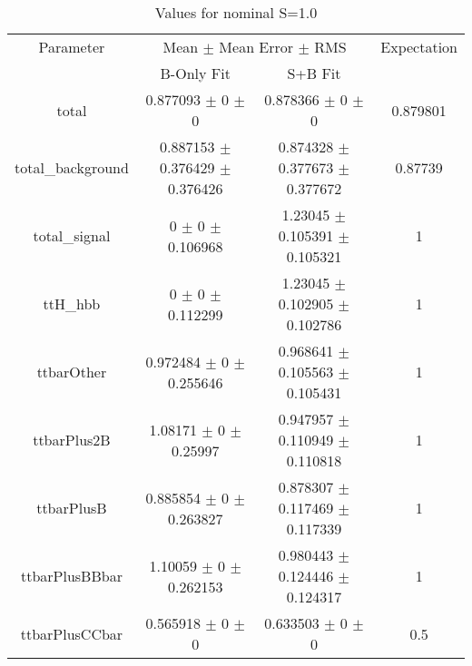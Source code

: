 \begin{table}
\centering
\caption{Values for nominal S=1.0}
\begin{tabular}{cccc}
\toprule
Parameter & \multicolumn{2}{c}{Mean $\pm$ Mean Error $\pm$ RMS} & Expectation\\
 & B-Only Fit & S+B Fit & \\
\midrule
total & \num{0.877093} $\pm$ \num{0} $\pm$ \num{0} & \num{0.878366} $\pm$ \num{0} $\pm$ \num{0} & \num{0.879801}\\
total\_background & \num{0.887153} $\pm$ \num{0.376429} $\pm$ \num{0.376426} & \num{0.874328} $\pm$ \num{0.377673} $\pm$ \num{0.377672} & \num{0.87739}\\
total\_signal & \num{0} $\pm$ \num{0} $\pm$ \num{0.106968} & \num{1.23045} $\pm$ \num{0.105391} $\pm$ \num{0.105321} & \num{1}\\
ttH\_hbb & \num{0} $\pm$ \num{0} $\pm$ \num{0.112299} & \num{1.23045} $\pm$ \num{0.102905} $\pm$ \num{0.102786} & \num{1}\\
ttbarOther & \num{0.972484} $\pm$ \num{0} $\pm$ \num{0.255646} & \num{0.968641} $\pm$ \num{0.105563} $\pm$ \num{0.105431} & \num{1}\\
ttbarPlus2B & \num{1.08171} $\pm$ \num{0} $\pm$ \num{0.25997} & \num{0.947957} $\pm$ \num{0.110949} $\pm$ \num{0.110818} & \num{1}\\
ttbarPlusB & \num{0.885854} $\pm$ \num{0} $\pm$ \num{0.263827} & \num{0.878307} $\pm$ \num{0.117469} $\pm$ \num{0.117339} & \num{1}\\
ttbarPlusBBbar & \num{1.10059} $\pm$ \num{0} $\pm$ \num{0.262153} & \num{0.980443} $\pm$ \num{0.124446} $\pm$ \num{0.124317} & \num{1}\\
ttbarPlusCCbar & \num{0.565918} $\pm$ \num{0} $\pm$ \num{0} & \num{0.633503} $\pm$ \num{0} $\pm$ \num{0} & \num{0.5}\\
\bottomrule
\end{tabular}
\end{table}